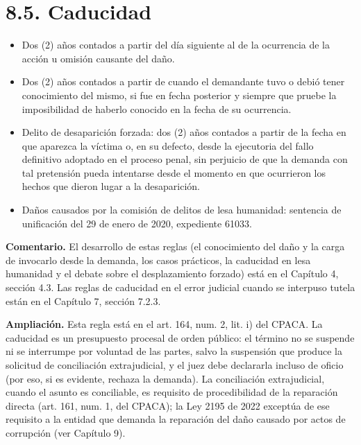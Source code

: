 \section{8.5. Caducidad}
\begin{itemize}
\item Dos (2) años contados a partir del día siguiente al de la ocurrencia de la acción u omisión causante del daño.
\item Dos (2) años contados a partir de cuando el demandante tuvo o debió tener conocimiento del mismo, si fue en fecha posterior y siempre que pruebe la imposibilidad de haberlo conocido en la fecha de su ocurrencia.
\item Delito de desaparición forzada: dos (2) años contados a partir de la fecha en que aparezca la víctima o, en su defecto, desde la ejecutoria del fallo definitivo adoptado en el proceso penal, sin perjuicio de que la demanda con tal pretensión pueda intentarse desde el momento en que ocurrieron los hechos que dieron lugar a la desaparición.
\item Daños causados por la comisión de delitos de lesa humanidad: sentencia de unificación del 29 de enero de 2020, expediente 61033.
\end{itemize}
\begin{comentario}
\textcolor[HTML]{8A6D3B}{\textbf{Comentario. }}El desarrollo de estas reglas (el conocimiento del daño y la carga de invocarlo desde la demanda, los casos prácticos, la caducidad en lesa humanidad y el debate sobre el desplazamiento forzado) está en el Capítulo 4, sección 4.3. Las reglas de caducidad en el error judicial cuando se interpuso tutela están en el Capítulo 7, sección 7.2.3.
\end{comentario}
\begin{ampliacion}
\textcolor[HTML]{5B3F8C}{\textbf{Ampliación. }}Esta regla está en el art. 164, num. 2, lit. i) del CPACA. La caducidad es un presupuesto procesal de orden público: el término no se suspende ni se interrumpe por voluntad de las partes, salvo la suspensión que produce la solicitud de conciliación extrajudicial, y el juez debe declararla incluso de oficio (por eso, si es evidente, rechaza la demanda). La conciliación extrajudicial, cuando el asunto es conciliable, es requisito de procedibilidad de la reparación directa (art. 161, num. 1, del CPACA); la Ley 2195 de 2022 exceptúa de ese requisito a la entidad que demanda la reparación del daño causado por actos de corrupción (ver Capítulo 9).
\end{ampliacion}
